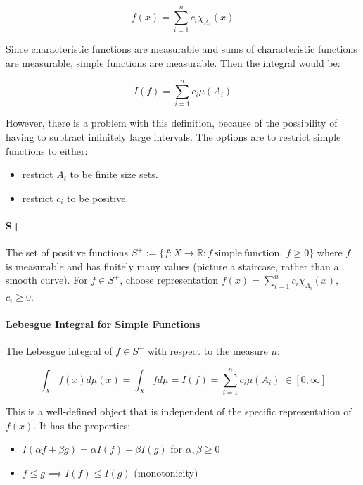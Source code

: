 \begin{equation}
f(x) = \sum_{i=1}^n c_i \chi_{A_i}(x)
\end{equation}

Since characteristic functions are measurable and sums of characteristic functions are measurable, simple functions are measurable. Then the integral would be:

\begin{equation}
I(f) = \sum_{i=1}^n c_i \mu(A_i)
\end{equation}

However, there is a problem with this definition, because of the possibility of having to subtract infinitely large intervals. The options are to restrict simple functions to either: 

\begin{itemize}
\item restrict $A_i$ to be finite size sets.
\item restrict $c_i$ to be positive. 
\end{itemize}

\paragraph{S+}
The set of positive functions $S^+ := \{ f:X\rightarrow\mathbb{R} : f \mathrm{\ simple\ function},\ f\geq0\}$ where $f$ is measurable and has finitely many values (picture a staircase, rather than a smooth curve). For $f\in S^+$, choose representation $f(x) = \sum_{i=1}^n c_i \chi_{A_i}(x)$, $c_i \geq 0$. 



\paragraph{Lebesgue Integral for Simple Functions}
The Lebesgue integral of $f\in S^+$ with respect to the measure $\mu$:

\begin{equation}
\int_X f(x) d\mu(x) = \int_X f d\mu = I(f) = \sum_{i=1}^n c_i \mu(A_i)\ \in [0,\infty]
\end{equation}

This is a well-defined object that is independent of the specific representation of $f(x)$. It has the properties:

\begin{itemize}
\item $I(\alpha f + \beta g) = \alpha I(f) + \beta I(g)$ for $\alpha,\beta \geq 0$
\item $f \leq g \implies I(f) \leq I(g)$ (monotonicity)
\end{itemize}

